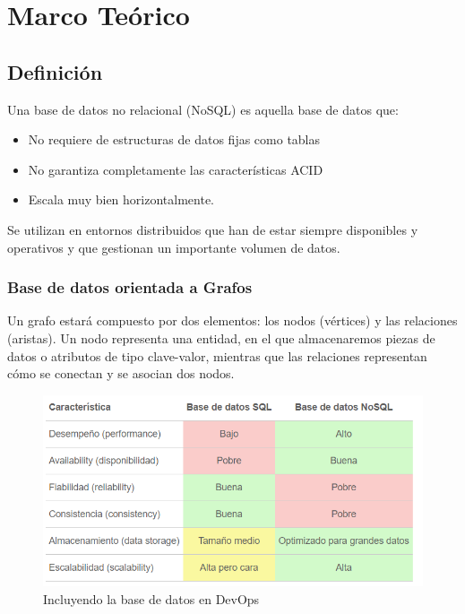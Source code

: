 \documentclass[preprint,12pt]{elsarticle}
\begin{document}
\section{Marco Teórico}


\subsection {\textbf{Definición}}

Una base de datos no relacional (NoSQL) es aquella base de datos que:

\begin{itemize}
	\item No requiere de estructuras de datos fijas como tablas
	\item No garantiza completamente las características ACID
	\item Escala muy bien horizontalmente.
\end{itemize}

Se utilizan en entornos distribuidos que han de estar siempre disponibles y operativos y que gestionan un importante volumen de datos.


\subsubsection{\textbf{Base de datos orientada a Grafos}}

Un grafo estará compuesto por dos elementos: los nodos (vértices) y las relaciones (aristas). Un nodo representa una entidad, en el que almacenaremos piezas de datos o atributos de tipo clave-valor, mientras que las relaciones representan cómo se conectan y se asocian dos nodos.\\

\begin{figure}[htb]
	\begin{center}
		\includegraphics[width=14cm]{./IMAGENES/basededatos_3} 
		\caption{Incluyendo la base de datos en DevOps}
	\end{center}
\end{figure}
\end{document}

